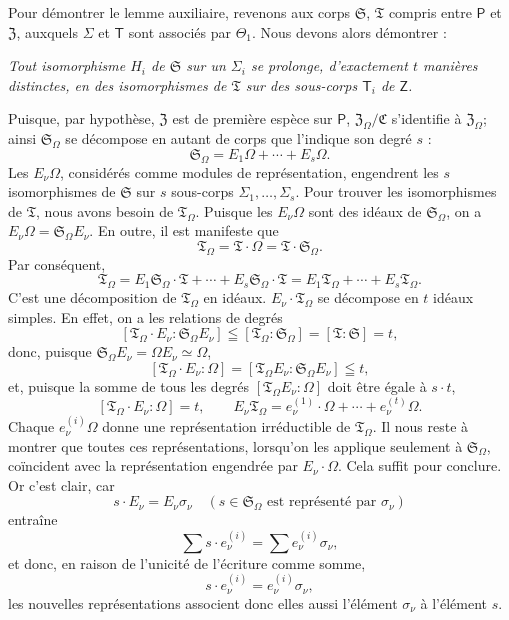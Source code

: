 Pour démontrer le lemme auxiliaire, revenons aux corps \(\mathfrak S\), \(\mathfrak T\) compris entre \(\mathsf P\) et \(\mathfrak Z\), auxquels \(\Sigma\) et \(\mathsf T\) sont associés par \(\Theta_1\). Nous devons alors démontrer :

\emph{Tout isomorphisme \(H_i\) de \(\mathfrak S\) sur un \(\Sigma_i\) se prolonge, d'exactement \(t\) manières distinctes, en des isomorphismes de \(\mathfrak T\) sur des sous-corps \(\mathsf T_i\) de \(\mathsf Z\).}

Puisque, par hypothèse, \(\mathfrak Z\) est de première espèce sur \(\mathsf P\), \(\mathfrak Z_\Omega/\mathfrak C\) s'identifie à \(\mathfrak Z_\Omega\); ainsi \(\mathfrak S_\Omega\) se décompose en autant de corps que l'indique son degré \(s\) :
\[
\mathfrak S_\Omega = E_1\Omega+\cdots+E_s\Omega .
\]
Les \(E_\nu\Omega\), considérés comme modules de représentation, engendrent les \(s\) isomorphismes de \(\mathfrak S\) sur \(s\) sous-corps \(\Sigma_1,\ldots,\Sigma_s\). Pour trouver les isomorphismes de \(\mathfrak T\), nous avons besoin de \(\mathfrak T_\Omega\). Puisque les \(E_\nu\Omega\) sont des idéaux de \(\mathfrak S_\Omega\), on a \(E_\nu\Omega=\mathfrak S_\Omega E_\nu\). En outre, il est manifeste que
\[
\mathfrak T_\Omega=\mathfrak T\cdot\Omega=\mathfrak T\cdot\mathfrak S_\Omega .
\]
Par conséquent,
\[
\mathfrak T_\Omega
=E_1\mathfrak S_\Omega\cdot\mathfrak T+\cdots+E_s\mathfrak S_\Omega\cdot\mathfrak T
=E_1\mathfrak T_\Omega+\cdots+E_s\mathfrak T_\Omega .
\]
C'est une décomposition de \(\mathfrak T_\Omega\) en idéaux. \(E_\nu\cdot\mathfrak T_\Omega\) se décompose en \(t\) idéaux simples. En effet, on a les relations de degrés
\[
[\mathfrak T_\Omega\cdot E_\nu:\mathfrak S_\Omega E_\nu]
\leqq [\mathfrak T_\Omega:\mathfrak S_\Omega]=[\mathfrak T:\mathfrak S]=t,
\]
donc, puisque \(\mathfrak S_\Omega E_\nu=\Omega E_\nu\simeq\Omega\),
\[
[\mathfrak T_\Omega\cdot E_\nu:\Omega]
=[\mathfrak T_\Omega E_\nu:\mathfrak S_\Omega E_\nu]\leqq t,
\]
et, puisque la somme de tous les degrés \([\mathfrak T_\Omega E_\nu:\Omega]\) doit être égale à \(s\cdot t\),
\[
[\mathfrak T_\Omega\cdot E_\nu:\Omega]=t,\qquad
E_\nu\mathfrak T_\Omega=e_\nu^{(1)}\cdot\Omega+\cdots+e_\nu^{(t)}\Omega .
\]
Chaque \(e_\nu^{(i)}\Omega\) donne une représentation irréductible de \(\mathfrak T_\Omega\). Il nous reste à montrer que toutes ces représentations, lorsqu'on les applique seulement à \(\mathfrak S_\Omega\), coïncident avec la représentation engendrée par \(E_\nu\cdot\Omega\). Cela suffit pour conclure. Or c'est clair, car
\[
s\cdot E_\nu=E_\nu\sigma_\nu\quad
(s\in\mathfrak S_\Omega\text{ est représenté par }\sigma_\nu)
\]
entraîne
\[
\sum s\cdot e_\nu^{(i)}=\sum e_\nu^{(i)}\sigma_\nu,
\]
et donc, en raison de l'unicité de l'écriture comme somme,
\[
s\cdot e_\nu^{(i)}=e_\nu^{(i)}\sigma_\nu,
\]
les nouvelles représentations associent donc elles aussi l'élément \(\sigma_\nu\) à l'élément \(s\).


